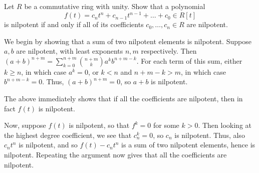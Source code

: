 %
\begin{question}[subtitle = January 2017 Problem 3,ID=Jan17_3]
Let $R$ be a commutative ring with unity. Show that a polynomial
\[f(t) = c_nt^n + c_{n-1}t^{n-1} + \dots + c_0 \in R[t]\]
is nilpotent if and only if all of its coefficients $c_0, \dots,c_n \in R$ are nilpotent.
\end{question}
\begin{solution}
We begin by showing that a sum of two nilpotent elements is nilpotent. Suppose $a,b$ are nilpotent, with least exponents $n,m$ respectively. Then $(a+b)^{n+m} = \sum_{k=0}^{n+m} \binom{n+m}{k} a^k b^{n+m-k}$. For each term of this sum, either $k \geq n$, in which case $a^k = 0$, or $k < n$ and $n+m-k > m$, in which case $b^{n+m-k} = 0$. Thus, $(a+b)^{n+m} = 0$, so $a+b$ is nilpotent.

The above immediately shows that if all the coefficients are nilpotent, then in fact $f(t)$ is nilpotent.

Now, suppose $f(t)$ is nilpotent, so that $f^k = 0$ for some $k > 0$. Then looking at the highest degree coefficient, we see that $c_n^k = 0$, so $c_n$ is nilpotent. Thus, also $c_nt^n$ is nilpotent, and so $f(t) - c_nt^n$ is a sum of two nilpotent elements, hence is nilpotent. Repeating the argument now gives that all the coefficients are nilpotent.
\end{solution}

